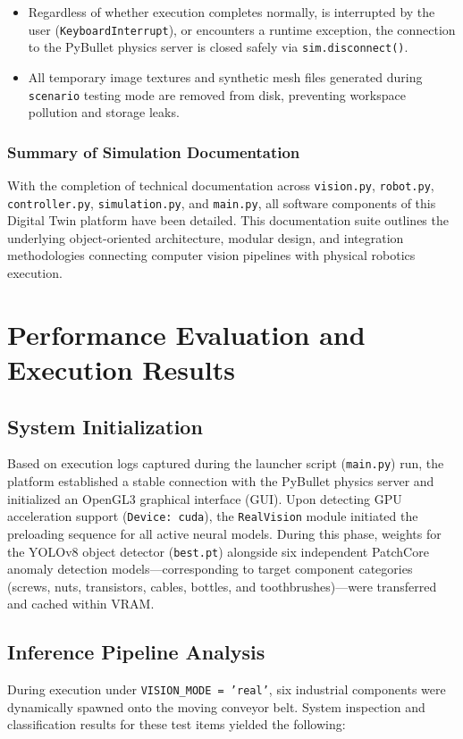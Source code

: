 \documentclass{article}
\begin{document}
\begin{itemize}
	\item Regardless of whether execution completes normally, is interrupted by the user (\texttt{KeyboardInterrupt}), or encounters a runtime exception, the connection to the PyBullet physics server is closed safely via \texttt{sim.disconnect()}.
	\item All temporary image textures and synthetic mesh files generated during \texttt{scenario} testing mode are removed from disk, preventing workspace pollution and storage leaks.
\end{itemize}

\subsubsection*{Summary of Simulation Documentation}
With the completion of technical documentation across \texttt{vision.py}, \texttt{robot.py}, \texttt{controller.py}, \texttt{simulation.py}, and \texttt{main.py}, all software components of this Digital Twin platform have been detailed. This documentation suite outlines the underlying object-oriented architecture, modular design, and integration methodologies connecting computer vision pipelines with physical robotics execution.

\section{Performance Evaluation and Execution Results}

\subsection{System Initialization}
Based on execution logs captured during the launcher script (\texttt{main.py}) run, the platform established a stable connection with the PyBullet physics server and initialized an OpenGL3 graphical interface (GUI). Upon detecting GPU acceleration support (\texttt{Device: cuda}), the \texttt{RealVision} module initiated the preloading sequence for all active neural models. During this phase, weights for the YOLOv8 object detector (\texttt{best.pt}) alongside six independent PatchCore anomaly detection models—corresponding to target component categories (screws, nuts, transistors, cables, bottles, and toothbrushes)—were transferred and cached within VRAM.

\subsection{Inference Pipeline Analysis}
During execution under \texttt{VISION\_MODE = 'real'}, six industrial components were dynamically spawned onto the moving conveyor belt. System inspection and classification results for these test items yielded the following:
\end{document}
